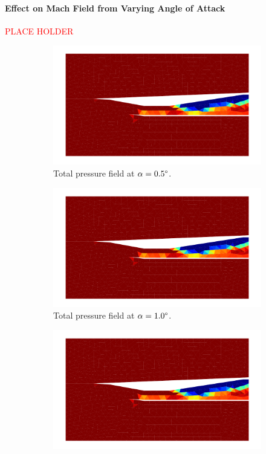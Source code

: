 \paragraph{Effect on Mach Field from Varying Angle of Attack}
\textcolor{red}{\large PLACE HOLDER}

\pagebreak
\begin{figure}[h]
    \centering
    \begin{subfigure}[h]{0.32\linewidth}
        \centering
        \includegraphics[width=\linewidth]{rep/q5/pt_a5.pdf}
        \caption{Total pressure field at $\alpha=0.5\degree$.}
    \end{subfigure}
    \begin{subfigure}[h]{0.32\linewidth}
        \centering
        \includegraphics[width=\linewidth]{rep/q5/pt_a10.pdf}
        \caption{Total pressure field at $\alpha=1.0\degree$.}
    \end{subfigure}
    \begin{subfigure}[h]{0.32\linewidth}
        \centering
        \includegraphics[width=\linewidth]{rep/q5/pt_a15.pdf}

\end{subfigure}
\end{figure}
